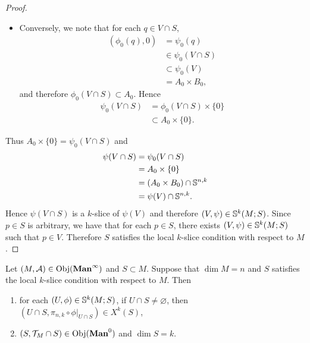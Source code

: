 \documentclass{book}
\begin{document}
\begin{proof}
\begin{itemize}
\begin{align*}
				& \in \psi_0[\psi_0^{-1}(A_0 \times \{0\})] \\
				& \subset \psi_0[\psi_0^{-1}(A_0 \times B_0)] \\
				& = \psi_0(V) .
			\end{align*}
			Therefore 
			\begin{align*}
				y
				& \in \psi_0(U_0) \cap \psi_0(V)  \\
				& = \psi_0[(U_0) \cap V] \\
				& = \psi_0([(U' \cap S) \cap V_0] \cap V) \\
				& = \psi_0(V \cap S).
			\end{align*}
			Since $y \in A_0 \times \{0\}$ is arbitrary, we have that $A_0 \times \{0\} \subset \psi_0(V \cap S)$.  
			\item Conversely, we note that for each $q \in V \cap S$, 
			\begin{align*}
				(\phi_0(q), 0)
				& =  \psi_0(q) \\
				& \in \psi_0(V \cap S) \\
				& \subset \psi_0(V) \\
				& = A_0 \times B_0, 
			\end{align*}
			and therefore $\phi_0(V \cap S) \subset A_0$. Hence 
			\begin{align*}
				\psi_0(V \cap S)
				& = \phi_0(V \cap S) \times \{0\} \\
				& \subset A_0 \times \{0\}.
			\end{align*}
		\end{itemize}
		Thus $A_0 \times \{0\} = \psi_0(V \cap S)$ and 
		\begin{align*}
			\psi(V \cap S)
			& = \psi_0(V \cap S) \\
			& = A_0 \times \{0\} \\
			& = (A_0 \times B_0) \cap \S^{n,k} \\
			& = \psi(V) \cap \S^{n,k}.
		\end{align*}
		Hence $\psi(V \cap S)$ is a $k$-slice of $\psi(V)$ and therefore $(V, \psi) \in \S^k(M; S)$. Since $p \in S$ is arbitrary, we have that for each $p \in S$, there exists $(V, \psi) \in \S^k(M; S)$ such that $p \in V$. Therefore $S$ satisfies the local $k$-slice condition with respect to $M$. 
	\end{proof}

	\begin{ex} 
		Let $(M, \MA) \in \Obj(\bManinf)$ and $S \subset M$. Suppose that $\dim M = n$ and $S$ satisfies the local $k$-slice condition with respect to $M$. Then 
		\begin{enumerate}
			\item for each $(U, \phi) \in \S^k(M; S)$, if $U \cap S \neq \varnothing$, then $(U \cap S, \pi_{n, k} \circ \phi|_{U \cap S}) \in X^k(S)$, 
			\item $(S, \MT_M \cap S) \in \Obj(\bManz)$ and $\dim S = k$.
		\end{enumerate}
	\end{ex}
\end{document}
